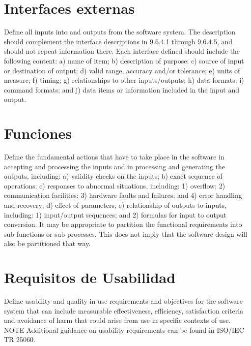 \documentclass[12pt, a4paper, twoside]{article}
\begin{document}
 \section{Interfaces externas}
 Define all inputs into and outputs from the software system. The description should complement the
 interface descriptions in 9.6.4.1 through 9.6.4.5, and should not repeat information there.
 Each interface defined should include the following content:
 a) name of item;
 b) description of purpose;
 c) source of input or destination of output;
 d) valid range, accuracy and/or tolerance;
 e) units of measure;
 f) timing;
 g) relationships to other inputs/outputs;
 h) data formats;
 i) command formats; and
 j) data items or information included in the input and output.

 \section{Funciones}
 Define the fundamental actions that have to take place in the software in accepting and processing the
 inputs and in processing and generating the outputs, including:
 a) validity checks on the inputs;
 b) exact sequence of operations;
 c) responses to abnormal situations, including:
 1) overflow;
 2) communication facilities;
 3) hardware faults and failures; and
 4) error handling and recovery;
 d) effect of parameters;
 e) relationship of outputs to inputs, including:
 1) input/output sequences; and
 2) formulas for input to output conversion.
 It may be appropriate to partition the functional requirements into sub-functions or sub-processes.
 This does not imply that the software design will also be partitioned that way.

 \section{Requisitos de Usabilidad}
 Define usability and quality in use requirements and objectives for the software system that can include
 measurable effectiveness, efficiency, satisfaction criteria and avoidance of harm that could arise from
 use in specific contexts of use.
 NOTE Additional guidance on usability requirements can be found in ISO/IEC TR 25060.
\end{document}
